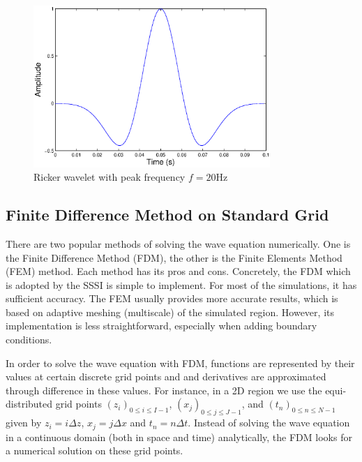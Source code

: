 \documentclass[11pt]{article}
\theoremstyle{plain}
\theoremstyle{definition}
\theoremstyle{remark}
\numberwithin{equation}{section}
\begin{document}
\begin{figure}
\centering
\includegraphics[width=0.8\textwidth]{Fig/ricker}
\caption{Ricker wavelet with peak frequency $f=20$Hz}
\label{fig:ricker}
\end{figure}

\subsection{Finite Difference Method on Standard Grid}
There are two popular methods of solving the wave equation numerically. One is the Finite Difference Method (FDM), the other is the Finite Elements Method (FEM) method. Each method has its pros and cons. Concretely, the FDM which is adopted by the SSSI is simple to implement. For most of the simulations, it has sufficient accuracy. The FEM usually provides more accurate results, which is based on adaptive meshing (multiscale) of the simulated region. However, its implementation is less straightforward, especially when adding boundary conditions.   

In order to solve the wave equation with FDM, functions are represented by their values at certain discrete grid points and and derivatives are approximated through difference in these values. For instance, in a 2D region we use the equi-distributed grid points $(z_i)_{0\le i \le I-1 }$, $(x_j)_{0\le j \le J-1}$, and $(t_n)_{0\le n \le N-1}$ given by $z_i = i\Delta z$, $x_j = j\Delta x$ and $t_n=n\Delta t$. Instead of solving the wave equation in a continuous domain (both in space and time) analytically, the FDM looks for a numerical solution on these grid points.  
\end{document}
